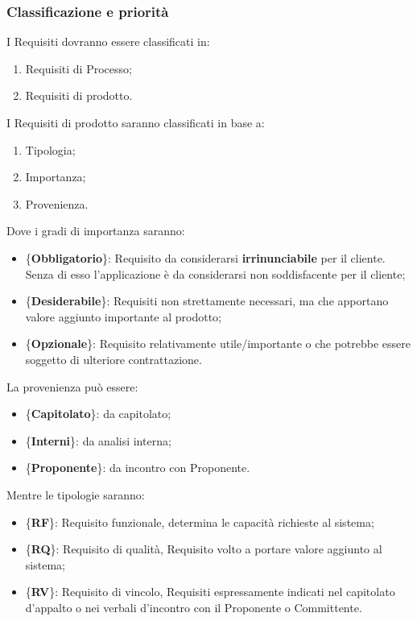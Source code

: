 {			\subsubsection{Classificazione e priorità}{
				I Requisiti dovranno essere classificati in:
				\begin{enumerate}
					\item Requisiti\ped{g} di Processo;
					\item Requisiti di prodotto.
				\end{enumerate}
				I Requisiti di prodotto saranno classificati in base a:
				\begin{enumerate}
					\item Tipologia;
					\item Importanza;
					\item Provenienza.
				\end{enumerate}
				Dove i gradi di importanza saranno:
				\begin{itemize}
						\item \{\textbf{Obbligatorio}\}: Requisito da considerarsi \textbf{irrinunciabile} per il cliente. Senza di esso l’applicazione è da considerarsi non soddisfacente per il cliente;
						\item \{\textbf{Desiderabile}\}: Requisiti non strettamente necessari, ma che apportano valore aggiunto importante al prodotto;
						\item \{\textbf{Opzionale}\}: Requisito relativamente utile/importante o che potrebbe essere soggetto di ulteriore contrattazione.
				\end{itemize}
				La provenienza può essere:
				\begin{itemize}
					\item \{\textbf{Capitolato}\}: da capitolato;
					\item \{\textbf{Interni}\}: da analisi interna;
					\item \{\textbf{Proponente}\}: da incontro con Proponente.
				\end{itemize}
				Mentre le tipologie saranno:
				\begin{itemize}
					\item \{\textbf{RF}\}: Requisito funzionale, determina le capacità richieste al sistema;
					\item \{\textbf{RQ}\}: Requisito\ped{g} di qualità, Requisito volto a portare valore aggiunto al sistema;
					\item \{\textbf{RV}\}: Requisito\ped{g} di vincolo, Requisiti espressamente indicati nel capitolato d’appalto o nei verbali d'incontro con il Proponente\ped{g} o Committente.
				\end{itemize}
			}
}
